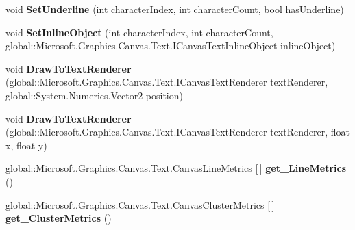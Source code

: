 \begin{DoxyCompactItemize}
\mbox{\label{class_microsoft_1_1_graphics_1_1_canvas_1_1_text_1_1_canvas_text_layout_a5c9ca1a5dab01179d0a389e3298b1f09}} 
void {\bfseries Set\+Underline} (int character\+Index, int character\+Count, bool has\+Underline)
\item 
\mbox{\label{class_microsoft_1_1_graphics_1_1_canvas_1_1_text_1_1_canvas_text_layout_a4d0d027830a031c0d15c1e89b0f84142}} 
void {\bfseries Set\+Inline\+Object} (int character\+Index, int character\+Count, global\+::\+Microsoft.\+Graphics.\+Canvas.\+Text.\+I\+Canvas\+Text\+Inline\+Object inline\+Object)
\item 
\mbox{\label{class_microsoft_1_1_graphics_1_1_canvas_1_1_text_1_1_canvas_text_layout_adcedc6eac15894cd67db704b047bb206}} 
void {\bfseries Draw\+To\+Text\+Renderer} (global\+::\+Microsoft.\+Graphics.\+Canvas.\+Text.\+I\+Canvas\+Text\+Renderer text\+Renderer, global\+::\+System.\+Numerics.\+Vector2 position)
\item 
\mbox{\label{class_microsoft_1_1_graphics_1_1_canvas_1_1_text_1_1_canvas_text_layout_ae94965b9797ceb30515e3352cba05fdd}} 
void {\bfseries Draw\+To\+Text\+Renderer} (global\+::\+Microsoft.\+Graphics.\+Canvas.\+Text.\+I\+Canvas\+Text\+Renderer text\+Renderer, float x, float y)
\item 
\mbox{\label{class_microsoft_1_1_graphics_1_1_canvas_1_1_text_1_1_canvas_text_layout_aeb404118734ea91e7bee88ebc313cec1}} 
global\+::\+Microsoft.\+Graphics.\+Canvas.\+Text.\+Canvas\+Line\+Metrics \mbox{[}$\,$\mbox{]} {\bfseries get\+\_\+\+Line\+Metrics} ()
\item 
\mbox{\label{class_microsoft_1_1_graphics_1_1_canvas_1_1_text_1_1_canvas_text_layout_a0d448b366382895fac2e94fc9b2358dd}} 
global\+::\+Microsoft.\+Graphics.\+Canvas.\+Text.\+Canvas\+Cluster\+Metrics \mbox{[}$\,$\mbox{]} {\bfseries get\+\_\+\+Cluster\+Metrics} ()
\item 

\end{DoxyCompactItemize}
